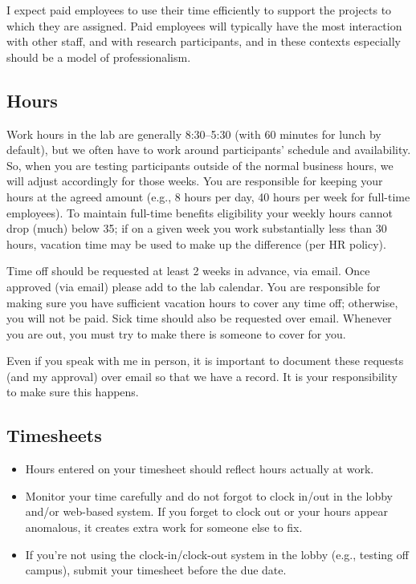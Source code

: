 \documentclass[letterpaper,11pt,oneside]{memoir}
\begin{document}
I expect paid employees to use their time efficiently to support the projects to which they are assigned. Paid employees will typically have the most interaction with other staff, and with research participants, and in these contexts especially should be a model of professionalism.

\subsection{Hours}
Work hours in the lab are generally 8:30--5:30 (with 60 minutes for lunch by default), but we often have to work around participants' schedule and availability. So, when you are testing participants outside of the normal business hours, we will adjust accordingly for those weeks. You are responsible for keeping your hours at the agreed amount (e.g., 8 hours per day, 40 hours per week for full-time employees). To maintain full-time benefits eligibility your weekly hours cannot drop (much) below 35; if on a given week you work substantially less than 30 hours, vacation time may be used to make up the difference (per HR policy).

Time off should be requested at least 2 weeks in advance, via email. Once approved (via email) please add to the lab calendar. You are responsible for making sure you have sufficient vacation hours to cover any time off; otherwise, you will not be paid. Sick time should also be requested over email. Whenever you are out, you must try to make there is someone to cover for you.

\begin{shaded}
\noindent Even if you speak with me in person, it is important to document these requests (and my approval) over email so that we have a record. It is your responsibility to make sure this happens.
\end{shaded}

\subsection{Timesheets}

\begin{itemize}
\item Hours entered on your timesheet should reflect hours actually at work.
\item Monitor your time carefully and do not forgot to clock in/out in the lobby and/or web-based system. If you forget to clock out or your hours appear anomalous, it creates extra work for someone else to fix. 
\item If you're not using the clock-in/clock-out system in the lobby (e.g., testing off campus), submit your timesheet before the due date.
\end{itemize}
\end{document}
